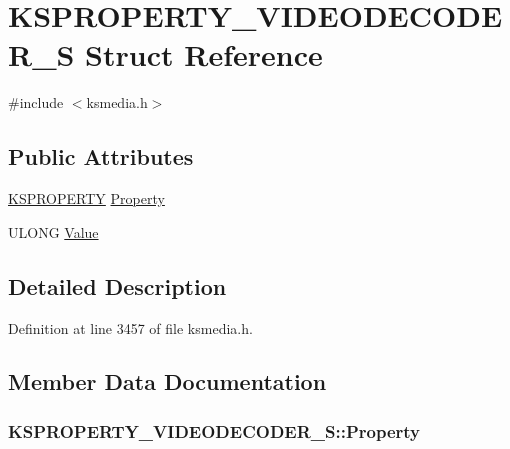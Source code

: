 \hypertarget{struct_k_s_p_r_o_p_e_r_t_y___v_i_d_e_o_d_e_c_o_d_e_r___s}{}\section{K\+S\+P\+R\+O\+P\+E\+R\+T\+Y\+\_\+\+V\+I\+D\+E\+O\+D\+E\+C\+O\+D\+E\+R\+\_\+S Struct Reference}
\label{struct_k_s_p_r_o_p_e_r_t_y___v_i_d_e_o_d_e_c_o_d_e_r___s}


{\ttfamily \#include $<$ksmedia.\+h$>$}

\subsection*{Public Attributes}
\begin{DoxyCompactItemize}
\item 
\hyperlink{ks_8h_a4392f77c74e868d813d46c39ada4d660}{K\+S\+P\+R\+O\+P\+E\+R\+TY} \hyperlink{struct_k_s_p_r_o_p_e_r_t_y___v_i_d_e_o_d_e_c_o_d_e_r___s_aa5cdaa13498d6e20ba31c77bf4b98871}{Property}
\item 
U\+L\+O\+NG \hyperlink{struct_k_s_p_r_o_p_e_r_t_y___v_i_d_e_o_d_e_c_o_d_e_r___s_a6f63ea6174e4621d47b0da499fd9324f}{Value}
\end{DoxyCompactItemize}


\subsection{Detailed Description}


Definition at line 3457 of file ksmedia.\+h.



\subsection{Member Data Documentation}
\subsubsection[{\texorpdfstring{Property}{Property}}]{ K\+S\+P\+R\+O\+P\+E\+R\+T\+Y\+\_\+\+V\+I\+D\+E\+O\+D\+E\+C\+O\+D\+E\+R\+\_\+\+S\+::\+Property}\hypertarget{struct_k_s_p_r_o_p_e_r_t_y___v_i_d_e_o_d_e_c_o_d_e_r___s_aa5cdaa13498d6e20ba31c77bf4b98871}{}\label{struct_k_s_p_r_o_p_e_r_t_y___v_i_d_e_o_d_e_c_o_d_e_r___s_aa5cdaa13498d6e20ba31c77bf4b98871}


